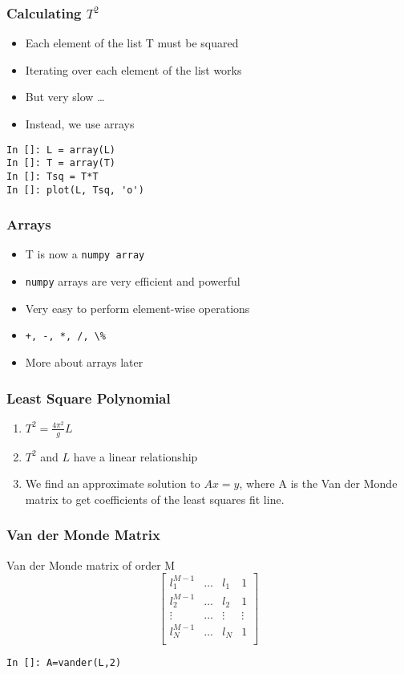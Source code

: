 \documentclass[14pt,compress]{beamer}
\newcommand{\typ}[1]{\lstinline{#1}}
\begin{document}
\begin{frame}[fragile]
\frametitle{Calculating $T^2$}
\begin{itemize}
\item Each element of the list T must be squared
\item Iterating over each element of the list works
\item But very slow \ldots
\item Instead, we use arrays
\end{itemize}
\begin{lstlisting}
In []: L = array(L)
In []: T = array(T)
In []: Tsq = T*T
In []: plot(L, Tsq, 'o')
\end{lstlisting}
\end{frame}

\begin{frame}[fragile]
\frametitle{Arrays}
\begin{itemize}
\item T is now a \typ{numpy array}
\item \typ{numpy} arrays are very efficient and powerful 
\item Very easy to perform element-wise operations
\item \typ{+, -, *, /, \%}
\item More about arrays later
\end{itemize}
\end{frame}

\begin{frame}[fragile]
\frametitle{Least Square Polynomial}
\begin{enumerate}
\item $T^2 = \frac{4\pi^2}{g}L$
\item $T^2$ and $L$ have a linear relationship
\item We find an approximate solution to $Ax = y$, where A is the Van der Monde matrix to get coefficients of the least squares fit line. 
\end{enumerate}
\end{frame}

\begin{frame}[fragile]
\frametitle{Van der Monde Matrix}
Van der Monde matrix of order M
\begin{equation*}
  \begin{bmatrix}
  l_1^{M-1} & \ldots & l_1 & 1 \\
  l_2^{M-1} & \ldots &l_2 & 1 \\
  \vdots & \ldots & \vdots & \vdots\\
  l_N^{M-1} & \ldots & l_N & 1 \\
  \end{bmatrix}
\end{equation*}
\begin{lstlisting}
In []: A=vander(L,2)
\end{lstlisting}
\end{frame}
\end{document}
